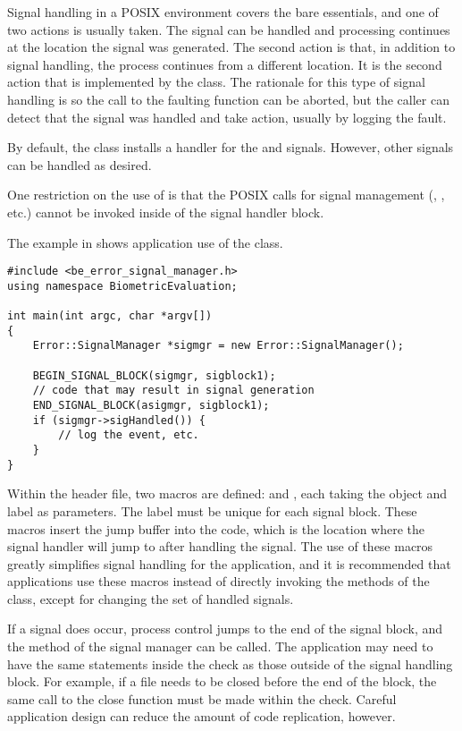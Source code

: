 Signal handling in a POSIX environment covers the bare essentials, and one of
two actions is usually taken. The signal can be handled and processing
continues at the location the signal was generated. The second action is
that, in addition to signal handling, the process continues from a different
location. It is the second action that is implemented by the
 class. The rationale for this type of signal handling is
so the call to the faulting function can be aborted, but the caller can
detect that the signal was handled and take action, usually by logging the
fault.

By default, the  class installs a handler for the
 and  signals. However, other signals can be
handled as desired.

One restriction on the use of  is that the POSIX calls for
signal management (, , etc.) cannot be
invoked inside of the signal handler block.

The example in  shows application use of the
 class.

\begin{lstlisting}[caption={Using the \class{SignalManger}}, label=lst:signalmanageruse]
#include <be_error_signal_manager.h>
using namespace BiometricEvaluation;

int main(int argc, char *argv[])
{
	Error::SignalManager *sigmgr = new Error::SignalManager();

	BEGIN_SIGNAL_BLOCK(sigmgr, sigblock1);
	// code that may result in signal generation
	END_SIGNAL_BLOCK(asigmgr, sigblock1);
	if (sigmgr->sigHandled()) {
		// log the event, etc.
	}
}
\end{lstlisting}

Within the  header file, two macros are defined:
 and , each taking the
 object and label as parameters. The label must be unique
for each signal block. These macros insert the
jump buffer into the code, which is the location where the signal handler will
jump to after handling the signal. The use of these macros greatly simplifies
signal handling for the application, and it is recommended that applications
use these macros instead of directly invoking the methods of the
 class, except for changing the set of handled signals.

If a signal does occur, process control jumps to the end of the signal block,
and the  method of the signal manager can be called. The
application may need to have the same statements inside the  check
as those outside of the signal handling block. For example, if a file needs
to be closed before the end of the block, the same call to the close function
must be made within the  check. Careful application design can
reduce the amount of code replication, however.

